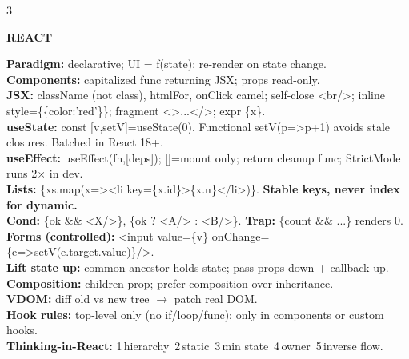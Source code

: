 \documentclass[10pt,letterpaper]{article}
\newenvironment{topic}[1]{%
  \par\addvspace{1.5pt}%
  \noindent\colorbox{hdrBG}{%
    \begin{minipage}{\dimexpr\linewidth-2\fboxsep\relax}%
      \centering\bfseries\sffamily\fontsize{6pt}{7pt}\selectfont\color{hdrFG}\MakeUppercase{#1}%
    \end{minipage}%
  }\par\nobreak\vskip0.5pt%
  \begingroup\setlength{\leftskip}{0pt}\setlength{\rightskip}{0pt}%
}{%
  \endgroup\par\addvspace{0.5pt}%
}
\newcommand{\warn}[1]{\textcolor{warnC}{\textbf{#1}}}
\newcommand{\hd}[1]{\textcolor{accent}{\textbf{#1}}}
\newcommand{\cn}[1]{{\ttfamily\small #1}}
\begin{document}
\begin{multicols*}{3}
\begin{topic}{React}
\hd{Paradigm:} declarative; \cn{UI = f(state)}; re-render on state change.\\
\hd{Components:} capitalized func returning JSX; props read-only.\\
\hd{JSX:} \cn{className} (not class), \cn{htmlFor}, \cn{onClick} camel; self-close \cn{<br/>}; inline \cn{style=\{\{color:'red'\}\}}; fragment \cn{<>...</>}; expr \cn{\{x\}}.\\
\hd{useState:} \cn{const [v,setV]=useState(0)}. Functional \cn{setV(p=>p+1)} avoids stale closures. Batched in React 18+.\\
\hd{useEffect:} \cn{useEffect(fn,[deps])}; \cn{[]}=mount only; return cleanup func; StrictMode runs 2$\times$ in dev.\\
\hd{Lists:} \cn{\{xs.map(x=><li key=\{x.id\}>\{x.n\}</li>)\}}. \warn{Stable keys, never index for dynamic.}\\
\hd{Cond:} \cn{\{ok \&\& <X/>\}}, \cn{\{ok ? <A/> : <B/>\}}. \warn{Trap:} \cn{\{count \&\& ...\}} renders \cn{0}.\\
\hd{Forms (controlled):} \cn{<input value=\{v\} onChange=\{e=>setV(e.target.value)\}/>}.\\
\hd{Lift state up:} common ancestor holds state; pass props down + callback up.\\
\hd{Composition:} \cn{children} prop; prefer composition over inheritance.\\
\hd{VDOM:} diff old vs new tree $\to$ patch real DOM.\\
\hd{Hook rules:} top-level only (no if/loop/func); only in components or custom hooks.\\
\hd{Thinking-in-React:} 1\,hierarchy~2\,static~3\,min state~4\,owner~5\,inverse flow.
\end{topic}


\end{multicols*}
\end{document}
